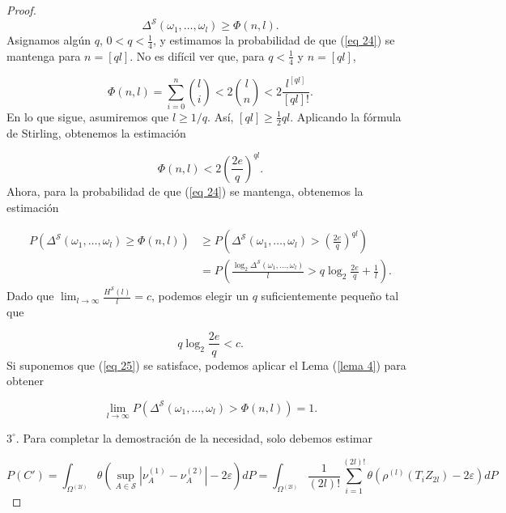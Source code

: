 \documentclass{report}
\begin{document}
\begin{proof}
\begin{equation}\label{eq 24}
\Delta^{\mathcal{S}}(\omega_1, \dots, \omega_l) \geq \Phi(n, l).
\end{equation}
Asignamos algún \( q \), \( 0 < q < \frac{1}{4} \), y estimamos la probabilidad de que (\ref{eq 24}) se mantenga para \( n = [ ql ] \). No es difícil ver que, para \( q < \frac{1}{4} \) y \( n = [ ql ] \),

\begin{equation*}
\Phi(n, l) = \sum_{i=0}^{n} \binom{l}{i} < 2 \binom{l}{n} < 2 \frac{l^{[ ql ]}}{[ ql ] !}.
\end{equation*}
En lo que sigue, asumiremos que \( l \geq 1/q \). Así, \( [ ql ] \geq \frac{1}{2} ql \). Aplicando la fórmula de Stirling, obtenemos la estimación

\begin{equation*}
\Phi(n, l) < 2 \left( \frac{2e}{q} \right)^{ql}.
\end{equation*}
Ahora, para la probabilidad de que (\ref{eq 24}) se mantenga, obtenemos la estimación

\begin{align*}
P \left( \Delta^{\mathcal{S}}(\omega_1, \dots, \omega_l) \geq \Phi(n, l) \right) 
&\geq P \left( \Delta^{\mathcal{S}}(\omega_1, \dots, \omega_l) > \left( \frac{2e}{q} \right)^{ql} \right) \\
&= P \left( \frac{\log_2 \Delta^{\mathcal{S}}(\omega_1, \dots, \omega_l)}{l} > q \log_2 \frac{2e}{q} + \frac{1}{l} \right).
\end{align*}
Dado que \( \lim_{l \to \infty} \frac{H^{\mathcal{S}}(l)}{l} = c \), podemos elegir un \( q \) suficientemente pequeño tal que

\begin{equation}\label{eq 25}
q \log_2 \frac{2e}{q} < c.
\end{equation}
Si suponemos que (\ref{eq 25}) se satisface, podemos aplicar el Lema (\ref{lema 4}) para obtener

\begin{equation}\label{eq 26}
\lim_{l \to \infty} P \left( \Delta^{\mathcal{S}}(\omega_1, \dots, \omega_l) > \Phi(n, l) \right) = 1.
\end{equation}

\( 3^\circ \). Para completar la demostración de la necesidad, solo debemos estimar

\begin{equation*}
P(C') = \int_{\Omega^{(2l)}} \theta \left( \sup_{A \in \mathcal{S}} | \nu_A^{(1)} - \nu_A^{(2)} | - 2\varepsilon \right) dP
= \int_{\Omega^{(2l)}} \frac{1}{(2l)!} \sum_{i=1}^{(2l)!} \theta \left( \rho^{(l)} (T_i Z_{2l}) - 2\varepsilon \right) dP
\end{equation*}


\end{proof}
\end{document}
